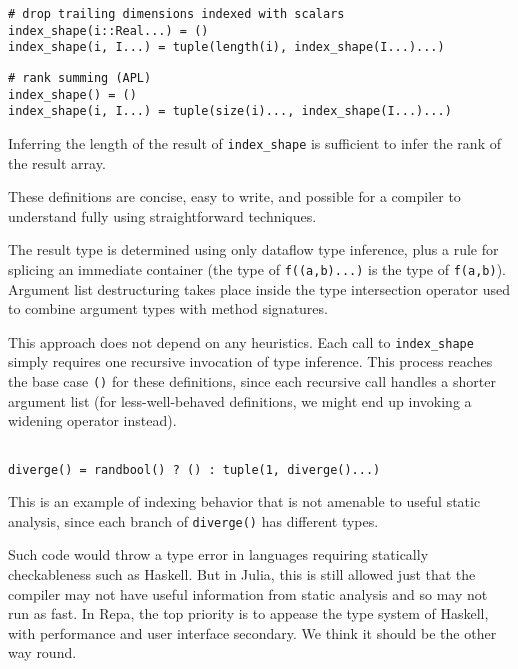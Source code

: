 \documentclass[preprint]{sigplanconf}
\newcommand{\code}[1]{\texttt{#1}}
\begin{document}
\begin{verbatim}
# drop trailing dimensions indexed with scalars
index_shape(i::Real...) = ()
index_shape(i, I...) = tuple(length(i), index_shape(I...)...)
\end{verbatim}

\begin{verbatim}
# rank summing (APL)
index_shape() = ()
index_shape(i, I...) = tuple(size(i)..., index_shape(I...)...)
\end{verbatim}

Inferring the length of the result of \texttt{index\_shape} is sufficient to
infer the rank of the result array.

These definitions are concise, easy to write, and possible for a compiler to
understand fully using straightforward techniques.


The result type is determined using only dataflow type inference, plus a rule
for splicing an immediate container (the type of \texttt{f((a,b)...)} is the
type of \texttt{f(a,b)}). Argument list destructuring takes place inside the
type intersection operator used to combine argument types with method
signatures.

This approach does not depend on any heuristics. Each call to
\texttt{index\_shape} simply requires one recursive invocation of type
inference. This process reaches the base case \texttt{()} for these
definitions, since each recursive call handles a shorter argument list (for
less-well-behaved definitions, we might end up invoking a widening operator
instead).

\begin{verbatim}

diverge() = randbool() ? () : tuple(1, diverge()...)

\end{verbatim}

This is an example of indexing behavior that is not amenable to useful static
analysis, since each branch of \code{diverge()} has different types.


Such code would throw a type error in languages requiring statically
checkableness such as Haskell. But in Julia, this is still allowed just that
the compiler may not have useful information from static analysis and so may
not run as fast. In Repa, the top priority is to appease the type system of
Haskell, with performance and user interface secondary. We think it should be
the other way round.
\end{document}
